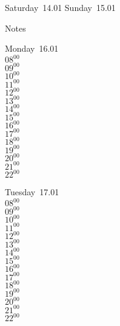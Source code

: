 \documentclass[11pt,a4paper]{book}\usepackage[]{graphicx}\usepackage[]{color}
\begin{document}
\begin{weekendbox}
  Saturday~14.01
  \tcblower
  Sunday~15.01
\end{weekendbox} %
\begin{notebox}
  Notes
\end{notebox}
\clearpage
\begin{headerbox}
\end{headerbox}
\begin{weekdaybox}
  Monday~16.01\\
  { 
  \vfill
  $08^{00}$\\
$09^{00}$\\
$10^{00}$\\
$11^{00}$\\
$12^{00}$\\
$13^{00}$\\
$14^{00}$\\
$15^{00}$\\
$16^{00}$\\
$17^{00}$\\
$18^{00}$\\
$19^{00}$\\
$20^{00}$\\
$21^{00}$\\
$22^{00}$\\
  }
\end{weekdaybox}
\begin{weekdaybox}
  Tuesday~17.01\\
  { 
  \vfill
  $08^{00}$\\
$09^{00}$\\
$10^{00}$\\
$11^{00}$\\
$12^{00}$\\
$13^{00}$\\
$14^{00}$\\
$15^{00}$\\
$16^{00}$\\
$17^{00}$\\
$18^{00}$\\
$19^{00}$\\
$20^{00}$\\
$21^{00}$\\
$22^{00}$\\
  }
\end{weekdaybox}
\end{document}
